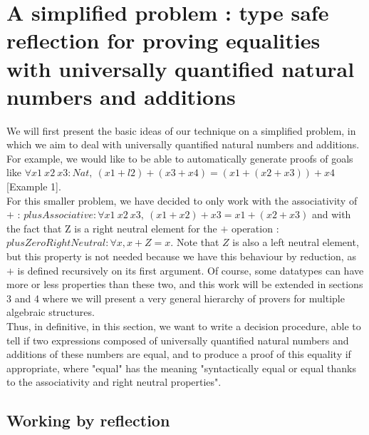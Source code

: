 \section{A simplified problem : type safe reflection for proving equalities with universally quantified natural numbers and additions}


We will first present the basic ideas of our technique on a simplified problem, in which we aim to deal with universally quantified natural numbers and additions.
For example, we would like to be able to automatically generate proofs of goals like $\forall x1\ x2\ x3:Nat,\ (x1 + l2) + (x3 + x4) = (x1 + (x2 + x3)) + x4$ [Example 1]. \\
For this smaller problem, we have decided to only work with the associativity of $+$ : $plusAssociative : \forall x1\ x2\ x3,\ (x1 + x2) + x3 = x1 + (x2 + x3)$ and with the fact that Z is a right neutral element for the $+$ operation : $plusZeroRightNeutral : \forall x, x + Z = x$. Note that $Z$ is also a left neutral element, but this property is not needed because we have this behaviour by reduction, as $+$ is defined recursively on its first argument. Of course, some datatypes can have more or less properties than these two, and this work will be extended in sections 3 and 4 where we will present a very general hierarchy of provers for multiple algebraic structures. \\
Thus, in definitive, in this section, we want to write a decision procedure, able to tell if two expressions composed of universally quantified natural numbers and additions of these numbers are equal, and to produce a proof of this equality if appropriate, where "equal" has the meaning "syntactically equal or equal thanks to the associativity and right neutral properties".


\subsection{Working by reflection}

